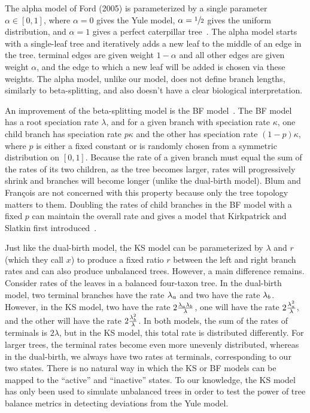 The alpha model of Ford (2005) is parameterized by a single parameter $\alpha\in[0,1]$, where $\alpha=0$ gives the Yule model, $\alpha=\sfrac{1}{2}$ gives the uniform distribution, and $\alpha = 1$ gives a perfect caterpillar tree~\cite{Ford2005}. The alpha model starts with a single-leaf tree and iteratively adds a new leaf to the middle of an edge in the tree. terminal edges are given weight $1-\alpha$ and all other edges are given weight $\alpha$, and the edge to which a new leaf will be added is chosen via these weights. The alpha model, unlike our model, does not define branch lengths, similarly to beta-splitting, and also doesn't have a clear biological interpretation.

An improvement of the beta-splitting model is the \gls{BF} model~\cite{Blum2006}. The \gls{BF} model has a root speciation rate $\lambda$, and for a given branch with speciation rate $\kappa$, one child branch has speciation rate $p\kappa$ and the other has speciation rate $(1-p)\kappa$, where $p$ is either a fixed constant or is randomly chosen from a symmetric distribution on $[0,1]$. Because the rate of a given branch must equal the sum of the rates of its two children, as the tree becomes larger, rates will progressively shrink and branches will become longer (unlike the dual-birth model). Blum and Fran\c{c}ois are not concerned with this property because only the tree topology matters to them. Doubling the rates of child branches in the \gls{BF} model with a fixed $p$ can maintain the overall rate and gives a model that Kirkpatrick and Slatkin first introduced~\cite{Kirkpatrick1993}.

Just like the dual-birth model, the \gls{KS} model can be parameterized by $\lambda$ and $r$ (which they call $x$) to produce a fixed ratio $r$ between the left and right branch rates and can also produce unbalanced trees. However, a main difference remains. Consider rates of the leaves in a balanced four-taxon tree. In the dual-birth model, two terminal branches have the rate $\lambda_a$ and two have the rate $\lambda_b$. However, in the KS model, two have the rate $2\frac{\lambda_a\lambda_b}{\lambda}$, one will have the rate $2\frac{\lambda_a^2}{\lambda}$, and the other will have the rate $2\frac{\lambda_b^2}{\lambda}$. In both models, the sum of the rates of terminals is $2\lambda$, but in the \gls{KS} model, this total rate is distributed differently. For larger trees, the terminal rates become even more unevenly distributed, whereas in the dual-birth, we always have two rates at terminals, corresponding to our two states. There is no natural way in which the \gls{KS} or \gls{BF} models can be mapped to the ``active'' and ``inactive'' states. To our knowledge, the \gls{KS} model has only been used to simulate unbalanced trees in order to test the power of tree balance metrics in detecting deviations from the Yule model.


